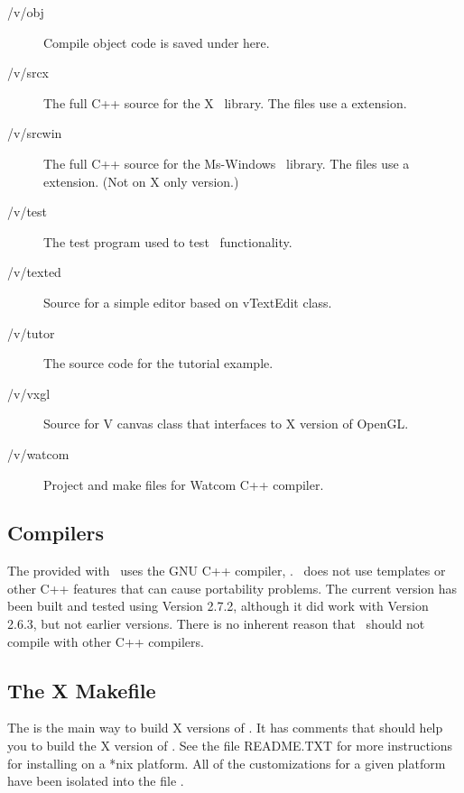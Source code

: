 \begin{description}
\item[/v/obj] Compile object code is saved under here.

\item[/v/srcx] The full C++ source for the X \V\ library. The files
use a  extension.

\item[/v/srcwin] The full C++ source for the Ms-Windows \V\ library. The files
use a  extension. (Not on X only version.)

\item[/v/test] The test program used to test \V\ functionality.

\item[/v/texted] Source for a simple editor based on vTextEdit class.

\item[/v/tutor] The source code for the tutorial example.

\item[/v/vxgl] Source for V canvas class that interfaces to X
version of OpenGL.

\item[/v/watcom] Project and make files for Watcom C++ compiler.

\end{description}

\subsection* {Compilers}

The  provided with \V\ uses the GNU C++ compiler,
. \V\ does not use templates or other C++ features that
can cause portability problems. The current version has been
built and tested using  Version 2.7.2, although it
did work with Version 2.6.3, but
not earlier versions. There is no inherent reason that \V\ should
not compile with other C++ compilers.

\subsection*{The X Makefile}

The  is the main way to build X versions of \V.
It has comments that should help you to build the X version of \V.
See the file README.TXT for more instructions for installing \V
on a *nix platform. All of the customizations for a given platform
have been isolated into the file \code[Config.mk].

